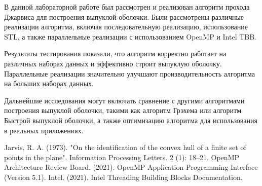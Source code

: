 \documentclass[]{article}
\theoremstyle{remark}
\theoremstyle{definition}
\begin{document}
\par В данной лабораторной работе был рассмотрен и реализован алгоритм прохода Джарвиса для построения выпуклой оболочки. Были рассмотрены различные реализации алгоритма, включая последовательную реализацию, использование STL, а также параллельные реализации с использованием OpenMP и Intel TBB.

\par Результаты тестирования показали, что алгоритм корректно работает на различных наборах данных и эффективно строит выпуклую оболочку. Параллельные реализации значительно улучшают производительность алгоритма на больших наборах данных.

\par Дальнейшие исследования могут включать сравнение с другими алгоритмами построения выпуклой оболочки, такими как алгоритм Грэхема или алгоритм Быстрой выпуклой оболочки, а также оптимизацию алгоритма для использования в реальных приложениях.

\newpage

\begin{thebibliography}{9}
 Jarvis, R. A. (1973). "On the identification of the convex hull of a finite set of points in the plane". Information Processing Letters. 2 (1): 18–21.
 OpenMP Architecture Review Board. (2021). OpenMP Application Programming Interface (Version 5.1). 
 Intel. (2021). Intel Threading Building Blocks Documentation.
\end{thebibliography}
\end{document}
